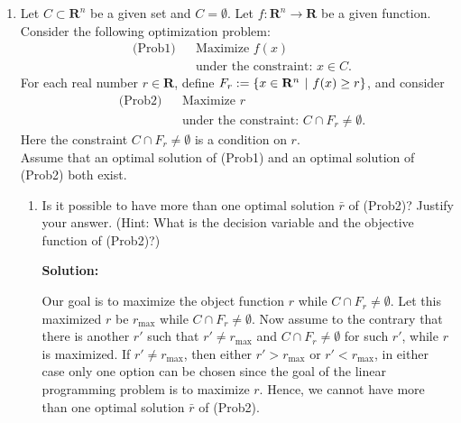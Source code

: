 \documentclass[12pt]{article}
\newenvironment{solution}
  {\par\noindent\textbf{Solution:}\par}
  {\par}
\begin{document}
\begin{enumerate}
  \item Let $C \subset \mathbf{R}^n$ be a given set and $C=\emptyset$. Let $f:\mathbf{R}^n \to \mathbf{R}$ be a given function. \\ Consider the following optimization problem:
    \begin{align*}
        &\text{(Prob1)} && \text{Maximize }  f(x) \\
        & && \text{under the constraint: } x \in C.
    \end{align*}
    For each real number $r \in \mathbf{R}$, define $F_r := \{ x \in \mathbf{R}^n \hspace{.05in} \vert \hspace{.05in} f(x) \ge r\}$, and consider 
    \begin{align*}
        &\text{(Prob2)} && \text{Maximize }  r \\
        & && \text{under the constraint: } C \cap F_r \neq \emptyset.
    \end{align*}
    Here the constraint $C \cap F_r \neq \emptyset$ is a condition on $r$. \\ 
    Assume that an optimal solution of (Prob1) and an optimal solution of (Prob2) both exist. 

    \begin{enumerate}[label=\alph*]
      \item Is it possible to have more than one optimal solution $\bar{r}$ of (Prob2)? Justify your answer. (Hint: What is the decision variable and the objective function of (Prob2)?)
        \begin{solution}
          Our goal is to maximize the object function $r$ while $C \cap F_r \neq \emptyset$. Let this maximized $r$ be $r_\text{max}$ while $C \cap F_r \neq \emptyset$. 
          Now assume to the contrary that there is another $r'$ such that $r' \neq r_\text{max}$ and $C \cap F_r \neq \emptyset$ for such $r'$, while $r$ is maximized.
          If $r' \neq r_\text{max}$, then either $r' > r_\text{max}$ or $r' < r_\text{max}$, in either case only one option can be chosen since the goal of the linear programming problem is to maximize $r$.
          Hence, we cannot have more than one optimal solution $\bar{r}$ of (Prob2).

        \end{solution}


\end{enumerate}
\end{enumerate}
\end{document}

